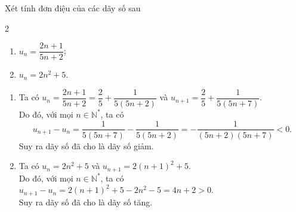 \begin{bt}%
	Xét tính đơn điệu của các dãy số sau
	\begin{multicols}{2}
		\begin{enumerate}
			\item $u_n=\dfrac{2n+1}{5n+2}$;
			\item $u_n=2n^2+5$.
		\end{enumerate}
	\end{multicols}
	\loigiai 
	{
		\begin{enumerate}
			\item Ta có $u_n=\dfrac{2n+1}{5n+2}=\dfrac{2}{5}+\dfrac{1}{5(5n+2)}$ và $u_{n+1}=\dfrac{2}{5}+\dfrac{1}{5(5n+7)}$.\\
			Do đó, với mọi $n\in \mathbb{N}^*$, ta có $$u_{n+1}-u_n=\dfrac{1}{5(5n+7)}-\dfrac{1}{5(5n+2)}=-\dfrac{1}{(5n+2)(5n+7)}<0.$$
			Suy ra dãy số đã cho là dãy số giảm.
			\item Ta có $u_n=2n^2+5$ và $u_{n+1}=2(n+1)^2+5$.\\
			Do đó, với mọi $n\in \mathbb{N}^*$, ta có $u_{n+1}-u_n=2(n+1)^2+5-2n^2-5=4n+2>0$.\\
			Suy ra dãy số đã cho là dãy số tăng.
		\end{enumerate}
	}
\end{bt}

